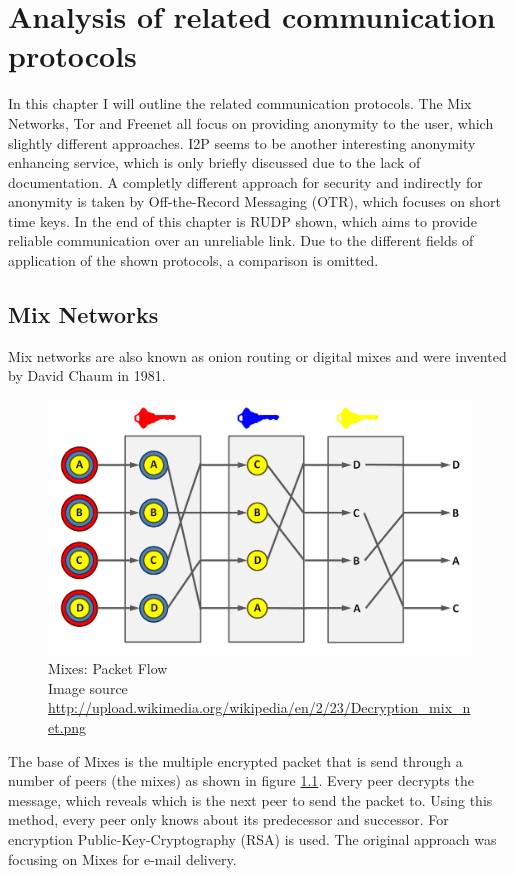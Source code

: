 \chapter{Analysis of related communication protocols}
\label{commprotocols}
In this chapter I will outline the related communication protocols.
The Mix Networks, Tor and Freenet all focus on providing anonymity to
the user, which slightly different approaches. I2P seems to be another
interesting anonymity enhancing service, which is only
briefly discussed due to the lack of documentation. A completly different
approach for security and indirectly for anonymity is taken by
Off-the-Record Messaging (OTR), which focuses on short time keys.
In the end of this chapter is RUDP shown, which aims to provide reliable
communication over an unreliable link.
Due to the different fields of application of the shown protocols, a
comparison is omitted.
\section{Mix Networks}
Mix networks are also known as onion routing or digital mixes and
were invented by David Chaum in 1981.\cite{Chaum:1981:UEM:358549.358563}
\begin{figure}
    \centering
    \caption[Mixes: Packet Flow]{Mixes: Packet Flow\\Image source \url{http://upload.wikimedia.org/wikipedia/en/2/23/Decryption_mix_net.png}}
    \label{mixesflow}
    \includegraphics[scale=0.3]{Decryption_mix_net.png}
\end{figure}
The base of Mixes is the multiple encrypted packet that is send through a
number of peers (the mixes) as shown in figure \ref{mixesflow}.
Every peer decrypts the message, which reveals which is the next peer
to send the packet to. Using this method, every peer only knows about
its predecessor and successor. For encryption Public-Key-Cryptography (RSA) is used.
The original approach was focusing on Mixes for e-mail delivery.

